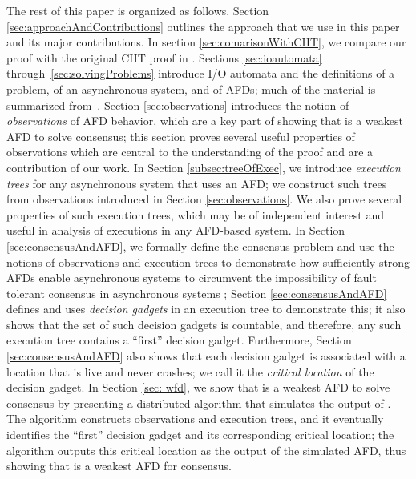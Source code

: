 \documentclass[11pt]{article}
\numberwithin{theorem}{section}
\begin{document}
The rest of this paper is organized as follows. Section \ref{sec:approachAndContributions} outlines the approach that we use in this paper and its major contributions. In section \ref{sec:comarisonWithCHT}, we compare our proof with the original CHT proof in \cite{chan:twfdf}. Sections \ref{sec:ioautomata} through~\ref{sec:solvingProblems} introduce I/O automata and the definitions of a problem, of an asynchronous system, and of AFDs; much of the material is summarized
from~\cite{cornejoetalAFD,cornejoetalAFD-TR}. Section \ref{sec:observations} introduces the notion of \emph{observations} of AFD behavior, which are a key part of showing that  is a weakest AFD to solve consensus; this section proves several useful properties of observations which are central to the understanding of the proof and are a contribution of our work. In Section \ref{subsec:treeOfExec}, we introduce \emph{execution trees} for any asynchronous system that uses an AFD; we construct such trees from observations introduced in Section \ref{sec:observations}. We also prove several properties of such execution trees, which may be of independent interest and useful in analysis of executions in any AFD-based system. In Section \ref{sec:consensusAndAFD}, we formally define the consensus problem and use the notions of observations and execution trees to demonstrate how sufficiently strong AFDs enable asynchronous systems to circumvent the impossibility of fault tolerant consensus in asynchronous systems \cite{FLP}; Section \ref{sec:consensusAndAFD} defines and uses \emph{decision gadgets} in an execution tree to demonstrate this; it also shows that the set of such decision gadgets is countable, and therefore, any such execution tree contains a ``first'' decision gadget. Furthermore, Section \ref{sec:consensusAndAFD} also shows that each decision gadget is associated with a location that is live and never crashes; we call it the \emph{critical location} of the decision gadget. In Section \ref{sec: wfd}, we show that  is a weakest AFD to solve consensus by presenting a distributed algorithm that simulates the output of . The algorithm constructs observations and execution trees, and it eventually identifies the ``first'' decision gadget and its corresponding critical location; the algorithm outputs this critical location as the output of the simulated  AFD, thus showing that  is a weakest AFD for consensus. 
\end{document}
